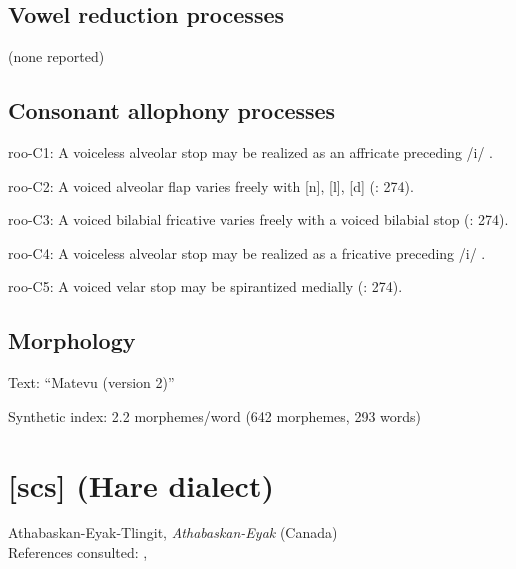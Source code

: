 {\subsection*{Vowel reduction processes}

(none reported)
\subsection*{Consonant allophony processes}
\begin{appendixdesc}

\item[roo-C1:] A voiceless alveolar stop may be realized as an affricate preceding /i/ \citep[28]{Robinson2011}.

\item[roo-C2:] A voiced alveolar flap varies freely with [n], [l], [d] (\citealt{FirchowFirchow1969}: 274).

\item[roo-C3:] A voiced bilabial fricative varies freely with a voiced bilabial stop (\citealt{FirchowFirchow1969}: 274).

\item[roo-C4:] A voiceless alveolar stop may be realized as a fricative preceding /i/ \citep[28]{Robinson2011}.

\item[roo-C5:] A voiced velar stop may be spirantized medially (\citealt{FirchowFirchow1969}: 274).
\end{appendixdesc}
\subsection*{Morphology}

\begin{appendixdesc}

\item[Text:] “Matevu (version 2)” \citep[293--304]{Robinson2011}

\item[Synthetic index:] 2.2 morphemes/word (642 morphemes, 293 words)
\end{appendixdesc}
\section*{[scs]  (Hare dialect)}   %
Athabaskan-Eyak-Tlingit, \textit{Athabaskan-Eyak} (Canada)\medskip\\
References consulted: \citet{Rice1989}, \citet{Rice2005}

}
